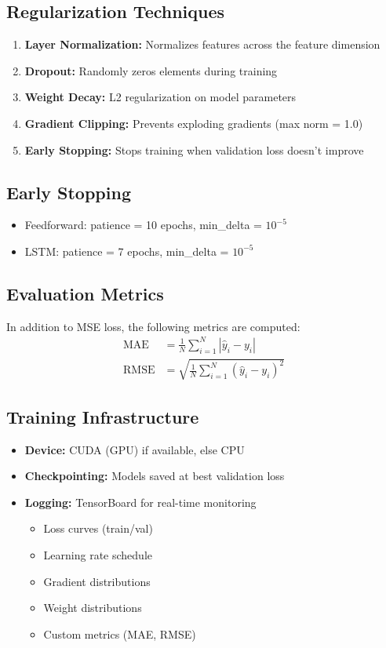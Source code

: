 \documentclass[12pt,a4paper]{article}
\begin{document}
\subsection{Regularization Techniques}
\begin{enumerate}
    \item \textbf{Layer Normalization:} Normalizes features across the feature dimension
    \item \textbf{Dropout:} Randomly zeros elements during training
    \item \textbf{Weight Decay:} L2 regularization on model parameters
    \item \textbf{Gradient Clipping:} Prevents exploding gradients (max norm = 1.0)
    \item \textbf{Early Stopping:} Stops training when validation loss doesn't improve
\end{enumerate}

\subsection{Early Stopping}
\begin{itemize}
    \item Feedforward: patience = 10 epochs, min\_delta = $10^{-5}$
    \item LSTM: patience = 7 epochs, min\_delta = $10^{-5}$
\end{itemize}

\subsection{Evaluation Metrics}
In addition to MSE loss, the following metrics are computed:
\begin{align}
    \text{MAE} &= \frac{1}{N}\sum_{i=1}^{N} |\hat{y}_i - y_i| \\
    \text{RMSE} &= \sqrt{\frac{1}{N}\sum_{i=1}^{N} (\hat{y}_i - y_i)^2}
\end{align}

\subsection{Training Infrastructure}
\begin{itemize}
    \item \textbf{Device:} CUDA (GPU) if available, else CPU
    \item \textbf{Checkpointing:} Models saved at best validation loss
    \item \textbf{Logging:} TensorBoard for real-time monitoring
    \begin{itemize}
        \item Loss curves (train/val)
        \item Learning rate schedule
        \item Gradient distributions
        \item Weight distributions
        \item Custom metrics (MAE, RMSE)
    \end{itemize}
\end{itemize}
\end{document}
